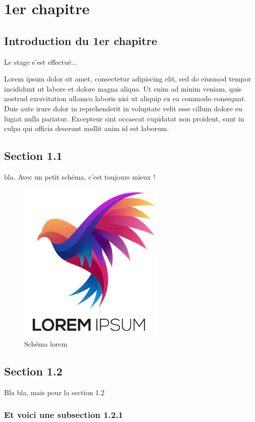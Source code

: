 
\chapter{1er chapitre}

\section*{Introduction du 1er chapitre}

Le stage s'est effectué...

Lorem ipsum dolor sit amet, consectetur adipiscing elit, sed do eiusmod tempor incididunt ut labore et dolore magna aliqua. Ut enim ad minim veniam, quis nostrud exercitation ullamco laboris nisi ut aliquip ex ea commodo consequat. Duis aute irure dolor in reprehenderit in voluptate velit esse cillum dolore eu fugiat nulla pariatur. Excepteur sint occaecat cupidatat non proident, sunt in culpa qui officia deserunt mollit anim id est laborum.

\section{Section 1.1}

bla.
Avec un petit schéma, c'est toujours mieux !
\begin{figure}[H]
    \centering
    \includegraphics[width=0.45\linewidth]{Images/10/lorem.png}
    \caption{Schéma lorem}
    \label{fig:LoremLabel}
\end{figure}

\section{Section 1.2}
Bla bla, mais pour la section 1.2 

\subsection{Et voici une subsection 1.2.1}

